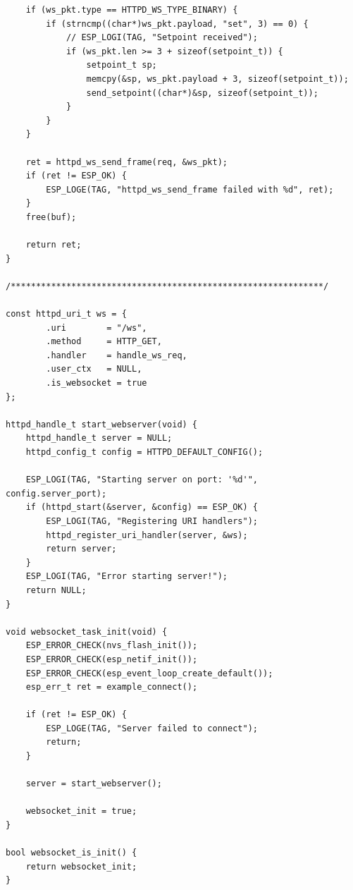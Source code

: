 \begin{lstlisting}
    if (ws_pkt.type == HTTPD_WS_TYPE_BINARY) {
        if (strncmp((char*)ws_pkt.payload, "set", 3) == 0) {
            // ESP_LOGI(TAG, "Setpoint received");
            if (ws_pkt.len >= 3 + sizeof(setpoint_t)) {
                setpoint_t sp;
                memcpy(&sp, ws_pkt.payload + 3, sizeof(setpoint_t));
                send_setpoint((char*)&sp, sizeof(setpoint_t));
            } 
        }
    }
    
    ret = httpd_ws_send_frame(req, &ws_pkt);
    if (ret != ESP_OK) {
        ESP_LOGE(TAG, "httpd_ws_send_frame failed with %d", ret);
    }
    free(buf);

    return ret;
}

/**************************************************************/

const httpd_uri_t ws = {
        .uri        = "/ws",
        .method     = HTTP_GET,
        .handler    = handle_ws_req,
        .user_ctx   = NULL,
        .is_websocket = true
};

httpd_handle_t start_webserver(void) {
    httpd_handle_t server = NULL;
    httpd_config_t config = HTTPD_DEFAULT_CONFIG();
    
    ESP_LOGI(TAG, "Starting server on port: '%d'", config.server_port);
    if (httpd_start(&server, &config) == ESP_OK) {
        ESP_LOGI(TAG, "Registering URI handlers");
        httpd_register_uri_handler(server, &ws);
        return server;
    }
    ESP_LOGI(TAG, "Error starting server!");
    return NULL;
}

void websocket_task_init(void) {
    ESP_ERROR_CHECK(nvs_flash_init());
    ESP_ERROR_CHECK(esp_netif_init());
    ESP_ERROR_CHECK(esp_event_loop_create_default());
    esp_err_t ret = example_connect();

    if (ret != ESP_OK) {
        ESP_LOGE(TAG, "Server failed to connect");
        return; 
    }

    server = start_webserver();

    websocket_init = true;
}

bool websocket_is_init() {
    return websocket_init;
}
\end{lstlisting}

